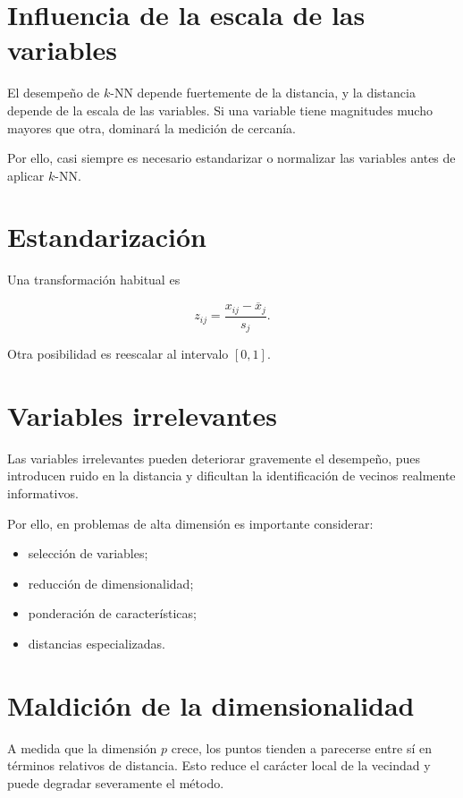 \documentclass[
  spanish,
  11pt,
  letterpaper,
  DIV=11,
  numbers=noendperiod]{scrreprt}
\providecommand{\tightlist}{%
  \setlength{\itemsep}{0pt}\setlength{\parskip}{0pt}}
\theoremstyle{definition}
\theoremstyle{plain}
\theoremstyle{definition}
\theoremstyle{remark}
\begin{document}
\section{Influencia de la escala de las
variables}\label{influencia-de-la-escala-de-las-variables}

El desempeño de \(k\)-NN depende fuertemente de la distancia, y la
distancia depende de la escala de las variables. Si una variable tiene
magnitudes mucho mayores que otra, dominará la medición de cercanía.

Por ello, casi siempre es necesario estandarizar o normalizar las
variables antes de aplicar \(k\)-NN.

\section{Estandarización}\label{estandarizaciuxf3n-1}

Una transformación habitual es

\[
z_{ij}
=
\frac{x_{ij}-\overline{x}_j}{s_j}.
\]

Otra posibilidad es reescalar al intervalo \([0,1]\).

\section{Variables irrelevantes}\label{variables-irrelevantes}

Las variables irrelevantes pueden deteriorar gravemente el desempeño,
pues introducen ruido en la distancia y dificultan la identificación de
vecinos realmente informativos.

Por ello, en problemas de alta dimensión es importante considerar:

\begin{itemize}
\tightlist
\item
  selección de variables;
\item
  reducción de dimensionalidad;
\item
  ponderación de características;
\item
  distancias especializadas.
\end{itemize}

\section{Maldición de la
dimensionalidad}\label{maldiciuxf3n-de-la-dimensionalidad}

A medida que la dimensión \(p\) crece, los puntos tienden a parecerse
entre sí en términos relativos de distancia. Esto reduce el carácter
local de la vecindad y puede degradar severamente el método.
\end{document}
